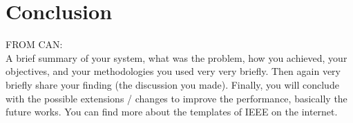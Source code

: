 \documentclass[journal]{IEEEtran}
\begin{document}
%
%


%





\section{Conclusion}
FROM CAN:
\\
A brief summary of your system, what was the problem, how you achieved, your objectives, and your methodologies you used very very briefly. Then again very briefly share your finding (the discussion you made). Finally, you will conclude with the possible extensions / changes to improve the performance, basically the future works. You can find more about the templates of IEEE on the internet.
\end{document}
